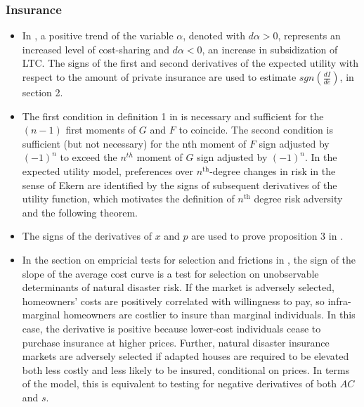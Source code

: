 \documentclass[11pt]{book}
\begin{document}
\subsubsection{Insurance}
\begin{itemize}
\item In \cite{zweifel2016long},
a positive trend of the variable $\alpha$, denoted with $d\alpha>0$,
represents an increased level of cost-sharing and $d\alpha<0$, an
increase in subsidization of LTC. The signs of the first and second
derivatives of the expected utility with respect to the amount of
private insurance are used to estimate $sgn\left(\frac{dI}{de}\right)$,
in section 2.
\item The first condition in definition 1 in \cite{grainich2017interaction}
is necessary and sufficient for the $\left(n-1\right)$ first moments
of $G$ and $F$ to coincide. The second condition is sufficient (but
not necessary) for the nth moment of $F$ sign adjusted by $(-1)^{n}$
to exceed the $n^{th}$ moment of $G$ sign adjusted by $(-1)^{n}$.
In the expected utility model, preferences over $n^{\text{th}}$-degree
changes in risk in the sense of Ekern are identified by the signs
of subsequent derivatives of the utility function, which motivates
the definition of $n^{\text{th}}$ degree risk adversity and the following
theorem.
\item The signs of the derivatives of $x$ and $p$ are used to prove proposition
3 in \cite{polinsky2018subrogation}.
\item In the section on empricial tests for selection and frictions in \cite{wagner2019adaptation},
the sign of the slope of the average cost curve is a test for selection
on unobservable determinants of natural disaster risk. If the market
is adversely selected, homeowners' costs are positively correlated
with willingness to pay, so infra-marginal homeowners are costlier
to insure than marginal individuals. In this case, the derivative
is positive because lower-cost individuals cease to purchase insurance
at higher prices. Further, natural disaster insurance markets are
adversely selected if adapted houses are required to be elevated both
less costly and less likely to be insured, conditional on prices.
In terms of the model, this is equivalent to testing for negative
derivatives of both $AC$ and $s$.
\end{itemize}
\end{document}
